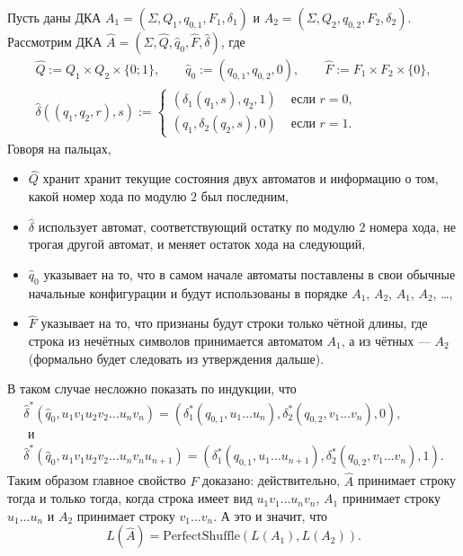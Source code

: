 \documentclass[12pt,a4paper]{article}
\begin{document}
    \begin{problem}{4}
        Пусть даны ДКА $A_1 = (\Sigma, Q_1, q_{0, 1}, F_1, \delta_1)$ и $A_2 = (\Sigma, Q_2, q_{0, 2}, F_2, \delta_2)$. Рассмотрим ДКА $\widehat{A} = (\Sigma, \widehat{Q}, \widehat{q}_0, \widehat{F}, \widehat{\delta})$, где
        \begin{gather*}
            \widehat{Q} := Q_1 \times Q_2 \times \{0; 1\},
            \qquad
            \widehat{q}_0 := (q_{0, 1}, q_{0, 2}, 0),
            \qquad
            \widehat{F} := F_1 \times F_2 \times \{0\},\\
            \widehat{\delta}((q_1, q_2, r), s) := 
            \begin{cases}
                (\delta_1(q_1, s), q_2, 1)& \text{ если } r = 0,\\
                (q_1, \delta_2(q_2, s), 0)& \text{ если } r = 1.
            \end{cases}
        \end{gather*}
        Говоря на пальцах,
        \begin{itemize}
            \item $\widehat{Q}$ хранит хранит текущие состояния двух автоматов и информацию о том, какой номер хода по модулю $2$ был последним,
            \item $\widehat{\delta}$ использует автомат, соответствующий остатку по модулю $2$ номера хода, не трогая другой автомат, и меняет остаток хода на следующий,
            \item $\widehat{q}_0$ указывает на то, что в самом начале автоматы поставлены в свои обычные начальные конфигурации и будут использованы в порядке $A_1$, $A_2$, $A_1$, $A_2$, \dots,
            \item $\widehat{F}$ указывает на то, что признаны будут строки только чётной длины, где строка из нечётных символов принимается автоматом $A_1$, а из чётных --- $A_2$ (формально будет следовать из утверждения дальше).
        \end{itemize}
        В таком случае несложно показать по индукции, что
        \begin{gather*}
            \widehat{\delta}^*(\widehat{q}_0, u_1 v_1 u_2 v_2 \dots u_n v_n) = (\delta_1^*(q_{0, 1}, u_1 \dots u_n), \delta_2^*(q_{0, 2}, v_1 \dots v_n), 0),\\
            \text{ и }\\
            \widehat{\delta}^*(\widehat{q}_0, u_1 v_1 u_2 v_2 \dots u_n v_n u_{n+1}) = (\delta_1^*(q_{0, 1}, u_1 \dots u_{n+1}), \delta_2^*(q_{0, 2}, v_1 \dots v_n), 1).
        \end{gather*}
        Таким образом главное свойство $F$ доказано: действительно, $\widehat{A}$ принимает строку тогда и только тогда, когда строка имеет вид $u_1 v_1 \dots u_n v_n$, $A_1$ принимает строку $u_1 \dots u_n$ и $A_2$ принимает строку $v_1 \dots v_n$. А это и значит, что
        \[L(\widehat{A}) = \mathrm{PerfectShuffle}(L(A_1), L(A_2)).\]
    \end{problem}
\end{document}
